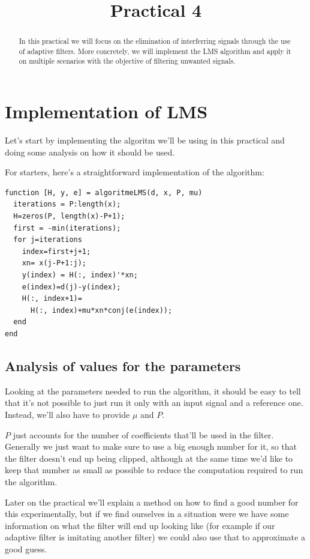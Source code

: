 \documentclass[conference,9pt]{IEEEtran}
\begin{document}
\title{Practical 4}

\author{
}

\maketitle
\begin{abstract}
In this practical we will focus on the elimination of interferring signals through the use of adaptive filters. More concretely, we will implement the LMS algorithm and apply it on multiple scenarios with the objective of filtering unwanted signals.
\end{abstract}

\section{Implementation of LMS}
Let's start by implementing the algoritm we'll be using in this practical and doing some analysis on how it should be used.

For starters, here's a straightforward implementation of the algorithm:
\begin{verbatim}
function [H, y, e] = algoritmeLMS(d, x, P, mu)
  iterations = P:length(x);
  H=zeros(P, length(x)-P+1);
  first = -min(iterations);
  for j=iterations
    index=first+j+1;
    xn= x(j-P+1:j);
    y(index) = H(:, index)'*xn;
    e(index)=d(j)-y(index);
    H(:, index+1)=
      H(:, index)+mu*xn*conj(e(index));
  end
end
\end{verbatim}

\subsection{Analysis of values for the parameters}
Looking at the parameters needed to run the algorithm, it should be easy to tell that it's not possible to just run it only with an input signal and a reference one. Instead, we'll also have to provide $\mu$ and $P$.

$P$ just accounts for the number of coefficients that'll be used in the filter. Generally we just want to make sure to use a big enough number for it, so that the filter doesn't end up being clipped, although at the same time we'd like to keep that number as small as possible to reduce the computation required to run the algorithm. 

Later on the practical we'll explain a method on how to find a good number for this experimentally, but if we find ourselves in a situation were we have some information on what the filter will end up looking like (for example if our adaptive filter is imitating another filter) we could also use that to approximate a good guess.
\end{document}
